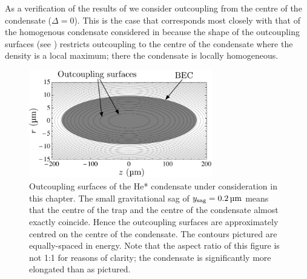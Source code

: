As a verification of the results of  we consider outcoupling from the centre of the condensate ($\Delta = 0$). This is the case that corresponds most closely with that of the homogenous condensate considered in  because the shape of the outcoupling surfaces (see ) restricts outcoupling to the centre of the condensate where the density is a local maximum; there the condensate is locally homogeneous.

\begin{figure}
    \centering
    \includegraphics[width=8cm]{OutcouplingSurfaces}
    \caption{Outcoupling surfaces of the He* condensate under consideration in this chapter. The small gravitational sag of $y_\text{sag} = \unit[0.2]{\micro m}$ means that the centre of the trap and the centre of the condensate almost exactly coincide. Hence the outcoupling surfaces are approximately centred on the centre of the condensate. The contours pictured are equally-spaced in energy. Note that the aspect ratio of this figure is not 1:1 for reasons of clarity; the condensate is significantly more elongated than as pictured. \label{Peaks:OutcouplingSurfaces}}
\end{figure}

